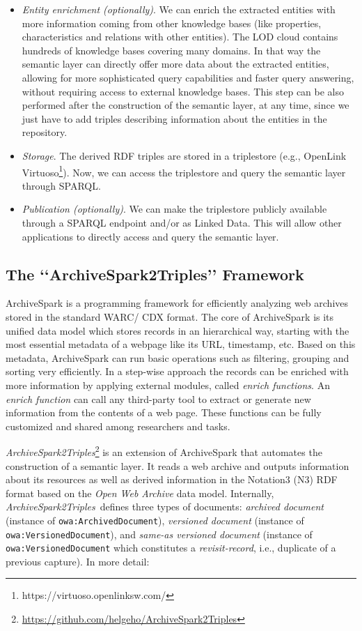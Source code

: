 \documentclass[twocolumn]{svjour3}
\newcommand{\q}[1]{\lq\lq{}{}#1\rq\rq{}{}}
\newcommand{\tool}[0]{{\em ArchiveSpark2Triples}}
\begin{document}
\begin{itemize}
\item
{\em Entity enrichment (optionally)}.
We can enrich the extracted entities with more
information coming from other knowledge bases
(like properties, characteristics and relations with other entities).
The LOD cloud contains hundreds of knowledge bases covering many domains.
In that way the semantic layer can directly offer more data about the extracted entities,
allowing for more sophisticated query capabilities
and faster query answering, without requiring
access to external knowledge bases.
This step can be also performed after the construction
of the semantic layer, at any time, since we
just have to add triples describing information about
the entities in the repository.

\item
{\em Storage}.
The derived RDF triples are stored in a triplestore
(e.g., OpenLink Virtuoso\footnote{https://virtuoso.openlinksw.com/}).
Now, we can access the triplestore and query the semantic layer
through SPARQL.

\item
{\em Publication (optionally)}.
We can make the triplestore publicly available through
a SPARQL endpoint and/or as Linked Data.
This will allow other applications to directly access and query
the semantic layer.
\end{itemize}


\subsection{The \q{ArchiveSpark2Triples} Framework}
\label{subsec:framework}

ArchiveSpark \cite{holzmann2016archivespark}
is a programming framework for efficiently analyzing
web archives stored in the standard WARC/ CDX format.
The core of ArchiveSpark is its unified data model
which stores records in an hierarchical way,
starting with the most essential metadata of a webpage like its URL, timestamp, etc.
Based on this metadata, ArchiveSpark can run basic operations
such as filtering, grouping and sorting very efficiently.
In a step-wise approach the records can be enriched
with more information by applying external modules,
called \textit{enrich functions}.
An \textit{enrich function} can call any third-party tool
to extract or generate new information from the contents of a web page.
These functions can be fully customized and shared among researchers and tasks.

\tool\footnote{\url{https://github.com/helgeho/ArchiveSpark2Triples}}
is an extension of ArchiveSpark that automates the
construction of a semantic layer.
It reads a web archive and outputs information about
its resources as well as derived information in the Notation3 (N3) RDF format
based on the {\em Open Web Archive} data model.
Internally, \tool\ defines three types of documents:
\textit{archived document} (instance of {\tt owa:Archi\-ved\-Do\-cu\-ment}),
\textit{versioned document} (instance of {\tt owa:Ve\-rsi\-oned\-Do\-cu\-ment}), and
\textit{same-as versioned document} (instance of {\tt owa:Ve\-rsi\-oned\-Do\-cu\-ment}
which constitutes a \textit{revisit-record}, i.e., duplicate of a previous capture).
In more detail:
\end{document}
